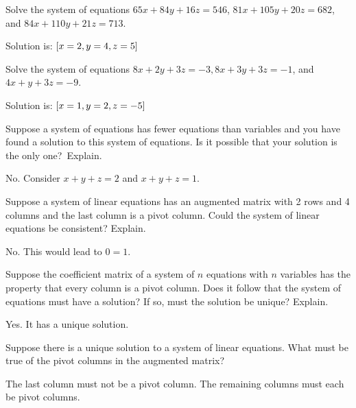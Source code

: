 \begin{enumialphparenastyle}
\begin{ex} Solve the system of equations
$65x+84y+16z=546$, $81x+105y+20z=682$, and $84x+110y+21z=713$.
\begin{sol}
Solution is:
$\left[x=2,y=4,z=5\right] $
\end{sol}
\end{ex}

\begin{ex} Solve the system of equations 
$8x+2y+3z=-3,8x+3y+3z=-1$, and $4x+y+3z=-9$.
\begin{sol}
Solution is: $\left[x=1,y=2,z=-5\right] $
\end{sol}
\end{ex}

\begin{ex} Suppose a system of equations has fewer equations than variables and
you have found a solution to this system of equations. Is it possible that
your solution is the only one?\ Explain.
\begin{sol}
No. Consider $x+y+z=2$ and $x+y+z=1$.
\end{sol}
\end{ex}

\begin{ex} Suppose a system of linear equations has an augmented
  matrix with 2 rows and 4 columns and the last column is a pivot
  column. Could the system of linear equations be consistent? Explain.
  \begin{sol}
    No. This would lead to $0=1$.
  \end{sol}
\end{ex}

\begin{ex} Suppose the coefficient matrix of a system of $n$ equations with $n$
variables has the property that every column is a pivot column. Does it
follow that the system of equations must have a solution? If so, must the
solution be unique? Explain. 
\begin{sol}
Yes. It has a unique solution.
\end{sol}
\end{ex}

\begin{ex} Suppose there is a unique solution to a system of linear equations.
What must be true of the pivot columns in the augmented matrix?
\begin{sol}
The last column must not be a pivot column. The remaining columns must each be pivot
columns.
\end{sol}
\end{ex}



\end{enumialphparenastyle}

